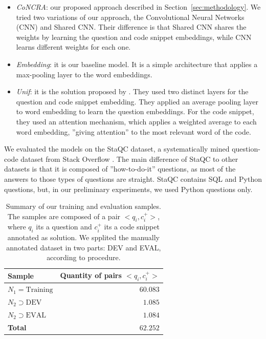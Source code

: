 \documentclass[sigconf]{acmart}
\begin{document}
\begin{itemize}
    \item \emph{CoNCRA}: our proposed approach described in Section~\ref{sec:methodology}. We tried two variations of our approach, the Convolutional Neural Networks (CNN) and Shared CNN. Their difference is that Shared CNN shares the weights by learning the question and code snippet embeddings, while CNN learns different weights for each one.
    \item \emph{Embedding}: it is our baseline model. It is a simple architecture that applies a max-pooling layer to the word embeddings. 
    \item \emph{Unif}: it is the solution proposed by \citet{cambronero-deep-code-search-2019}. They used two distinct layers for the question and code snippet embedding. They applied an average pooling layer to word embedding to learn the question embeddings. For the code snippet, they used an attention mechanism, which applies a weighted average to each word embedding, ''giving attention'' to the most relevant word of the code.
\end{itemize}

We evaluated the models on the StaQC dataset, a systematically mined question-code dataset from Stack Overflow \cite{yao-2018}. The main difference of StaQC to other datasets is that it is composed of ''how-to-do-it'' questions, as most of the answers to those types of questions are straight. StaQC contains SQL and Python questions, but, in our preliminary experiments, we used Python questions only. 

\begin{table}[h]
\centering
\begin{tabular}{ l r  }
 \hline
 \textbf{Sample} & \textbf{Quantity of pairs $<q_{i}, c_{i}^{+}>$}\\
 \hline
 $N_{1} = \text{Training}$ & $60.083$\\
 
 $N_{2} \supset \text{DEV}$ & $1.085$ \\
 
 $N_{2} \supset \text{EVAL}$ & $1.084$\\
 \hline
 \textbf{Total} & $\bm{62.252}$\\
 \hline
\end{tabular}
\caption{Summary of our training and evaluation samples. The samples are composed of a pair $<q_{i}, c_{i}^{+}>$, where $q_{i}$ its a question and $c_{i}^{+}$ its a code snippet annotated as solution. We spplited the manually annotated dataset in two parts: DEV and EVAL, according to \cite{iyer-etal-2016-summarizing} procedure. }
\label{table:training-sample-division}
\end{table}
\end{document}
